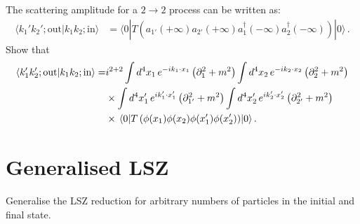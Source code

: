 \documentclass{tutorial}
\begin{document}
The scattering amplitude for a $2\rightarrow 2$ process can be
written as:
\begin{align}
  \label{eq:4}
  \langle k_1' k_2';\mathrm{out} | k_1 k_2; \mathrm{in} \rangle
   & = \langle 0 | T\left(
  a_{1'}(+\infty) a_{2'}(+\infty)
  a_1^\dagger(-\infty) a_2^\dagger(-\infty)
  \right) |0 \rangle\, .
\end{align}
Show that
\begin{align}
  \label{eq:5}
  \langle k_1' k_2';\mathrm{out} | k_1 k_2; \mathrm{in} \rangle
  = & i^{2+2}
  \int d^4x_1\, e^{-i k_1\cdot x_1} \left(\partial_1^2 + m^2\right)
  \int d^4x_2\, e^{-i k_2\cdot x_2} \left(\partial_2^2 +
  m^2\right)  \nonumber                                                             \\
    & \times \int d^4x_1'\, e^{i k_1'\cdot x_1'} \left(\partial_{1'}^2 + m^2\right)
  \int d^4x_2'\, e^{i k_2'\cdot x_2'} \left(\partial_{2'}^2 +
  m^2\right) \nonumber                                                              \\
    & \times \expval{T\left(
    \phi(x_1) \phi(x_2) \phi(x_1') \phi(x_2')
    \right) }{0}.
\end{align}

\section{Generalised LSZ}

Generalise the LSZ reduction for arbitrary numbers of particles in
the initial and final state.
\end{document}
